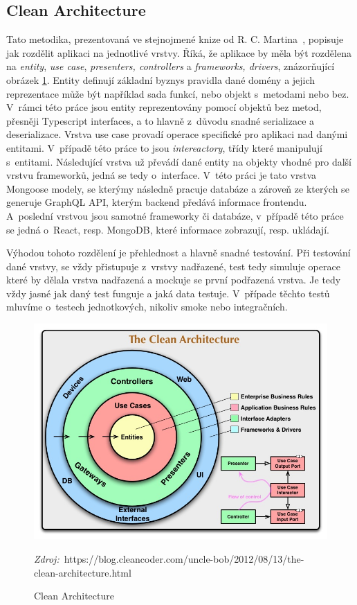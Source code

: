 \subsection{Clean Architecture}
\label{ss:clean_architecture}
Tato metodika, prezentovaná ve stejnojmené knize od R. C. Martina~\cite{martin_2018_clean}, popisuje jak rozdělit aplikaci na jednotlivé vrstvy. Říká, že aplikace by měla být rozdělena na \emph{entity}, \emph{use case}, \emph{presenters, controllers} a \emph{frameworks, drivers}, znázorňující obrázek \ref{fig:clean_architecture}.
Entity definují základní byznys pravidla dané domény a jejich reprezentace může být například sada funkcí, nebo objekt s~metodami nebo bez. V~rámci této práce jsou entity reprezentovány pomocí objektů bez metod, přesněji Typescript interfaces, a to hlavně z~důvodu snadné serializace a deserializace.
Vrstva use case provadí operace specifické pro aplikaci nad danými entitami. V~případě této práce to jsou \emph{intereactory}, třídy které manipulují s~entitami.
Následující vrstva už převádí dané entity na objekty vhodné pro další vrstvu frameworků, jedná se tedy o~interface. V~této práci je tato vrstva Mongoose modely, se kterýmy následně pracuje databáze a zároveň ze kterých se generuje GraphQL API, kterým backend předává informace frontendu. A~poslední vrstvou jsou samotné frameworky či databáze, v~případě této práce se jedná o~React, resp. MongoDB, které informace zobrazují, resp. ukládají.

Výhodou tohoto rozdělení je přehlednost a hlavně snadné testování. Při testování dané vrstvy, se vždy přistupuje z~vrstvy nadřazené, test tedy simuluje operace které by dělala vrstva nadřazená a mockuje se první podřazená vrstva. Je tedy vždy jasné jak daný test funguje a jaká data testuje. V~případe těchto testů mluvíme o~testech jednotkových, nikoliv smoke nebo integračních.

\begin{figure}
    \centering
    \includegraphics[width=\textwidth]{assets/clean_architecture.jpg}
    \caption{Clean Architecture}
    \label{fig:clean_architecture}
    \textit{Zdroj:}~https://blog.cleancoder.com/uncle-bob/2012/08/13/the-clean-architecture.html
\end{figure}
